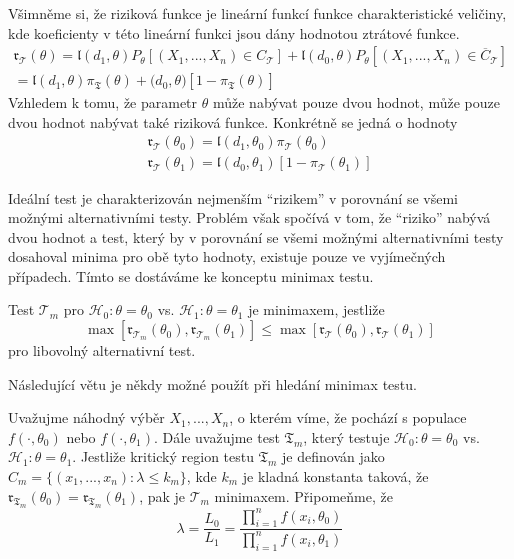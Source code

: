 Všimněme si, že riziková funkce je lineární funkcí funkce charakteristické veličiny, kde koeficienty v této lineární funkci jsou dány hodnotou ztrátové funkce.
\begin{multline*}
\mathfrak{r}_{\mathscr{T}}(\theta) = \mathfrak{l}(d_1, \theta)P_{\theta}[(X_1, ..., X_n) \in C_{\mathscr{T}}] + \mathfrak{l}(d_0, \theta)P_{\theta}[(X_1, ..., X_n) \in \overline{C}_{\mathscr{T}}]\\
= \mathfrak{l}(d_1, \theta) \pi_{\mathfrak{T}}(\theta) + \mathfrak(d_0, \theta)[1 - \pi_{\mathfrak{T}}(\theta)]
\end{multline*}
Vzhledem k tomu, že parametr $\theta$ může nabývat pouze dvou hodnot, může pouze dvou hodnot nabývat také riziková funkce. Konkrétně se jedná o hodnoty
\begin{gather*}
\mathfrak{r}_{\mathscr{T}}(\theta_0) = \mathfrak{l}(d_1, \theta_0)\pi_{\mathscr{T}}(\theta_0)\\
\mathfrak{r}_{\mathscr{T}}(\theta_1) = \mathfrak{l}(d_0, \theta_1)[1 - \pi_{\mathscr{T}}(\theta_1)]
\end{gather*}

Ideální test je charakterizován nejmenším ``rizikem'' v porovnání se všemi možnými alternativními testy. Problém však spočívá v tom, že ``riziko'' nabývá dvou hodnot a test, který by v porovnání se všemi možnými alternativními testy dosahoval minima pro obě tyto hodnoty, existuje pouze ve vyjímečných případech. Tímto se dostáváme ke konceptu minimax testu.

\begin{definition}
Test $\mathscr{T}_m$ pro $\mathscr{H}_0: \theta = \theta_0$ vs. $\mathscr{H}_1: \theta = \theta_1$ je minimaxem, jestliže
\begin{equation*}
\max[\mathfrak{r}_{\mathscr{T}_m}(\theta_0), \mathfrak{r}_{\mathscr{T}_m}(\theta_1)] \le \max[\mathfrak{r}_{\mathscr{T}}(\theta_0), \mathfrak{r}_{\mathscr{T}}(\theta_1)] 
\end{equation*}
pro libovolný alternativní test.
\end{definition}

Následující větu je někdy možné použít při hledání minimax testu.

\begin{theorem}
Uvažujme náhodný výběr $X_1, ... ,X_n$, o kterém víme, že pochází s populace $f(\cdot, \theta_0)$ nebo $f(\cdot, \theta_1)$. Dále uvažujme test $\mathfrak{T}_m$, který testuje $\mathscr{H}_0: \theta = \theta_0$ vs. $\mathscr{H}_1: \theta = \theta_1$. Jestliže kritický region testu $\mathfrak{T}_m$ je definován jako $C_m = \{(x_1, ..., x_n): \lambda \le k_m \}$, kde $k_m$ je kladná konstanta taková, že $\mathfrak{r}_{\mathfrak{T}_m}(\theta_0) = \mathfrak{r}_{\mathfrak{T}_m}(\theta_1)$, pak je $\mathscr{T}_m$ minimaxem. Připomeňme, že
\begin{equation*}
\lambda = \frac{L_0}{L_1} = \frac{\prod_{i = 1}^n f(x_i, \theta_0)}{\prod_{i = 1}^n f(x_i, \theta_1)}
\end{equation*} 
\end{theorem}

